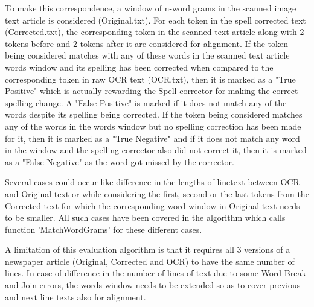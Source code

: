 \documentclass[letterpaper,11pt]{report}
\begin{document}
To make this correspondence, a window of n-word grams in the scanned image text article is considered (Original.txt). For each token in the spell corrected text (Corrected.txt), the corresponding token  in the scanned text article along with 2 tokens before and 2 tokens after it are considered for alignment. If the token being considered matches with any of these words in the scanned text article words window and its spelling has been corrected when compared to the corresponding token in raw OCR text (OCR.txt), then it is marked as a "True Positive" which is actually rewarding the Spell corrector for making the correct spelling change. A "False Positive" is marked if it does not match any of the words despite its spelling being corrected. If the token being considered matches any of the words in the words window but no spelling correction has been made for it, then it is marked as a "True Negative" and if it does not match any word in the window and the spelling corrector also did not correct it, then it is marked as a "False Negative" as the word got missed by the corrector. 

Several cases could occur like difference in the lengths of linetext between OCR and Original text or while considering the first, second or the last tokens from the Corrected text for which the corresponding word window in Original text needs to be smaller. All such cases have been covered in the algorithm which calls function 'MatchWordGrams' for these different cases. 

A limitation of this evaluation algorithm is that it requires all 3 versions of a newspaper article (Original, Corrected and OCR) to have the same number of lines. In case of difference in the number of lines of text due to some Word Break and Join errors, the words window needs to be extended so as to cover previous and next line texts also for alignment.
\end{document}
